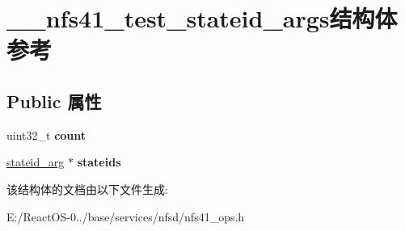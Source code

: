 \hypertarget{struct____nfs41__test__stateid__args}{}\section{\+\_\+\+\_\+nfs41\+\_\+test\+\_\+stateid\+\_\+args结构体 参考}
\label{struct____nfs41__test__stateid__args}
\subsection*{Public 属性}
\begin{DoxyCompactItemize}
\item 
\mbox{\label{struct____nfs41__test__stateid__args_ae82f79f9d5fd575590a52daec866e42f}} 
uint32\+\_\+t {\bfseries count}
\item 
\mbox{\label{struct____nfs41__test__stateid__args_a3b2a607d017b389f5719c0c03b014260}} 
\hyperlink{struct____stateid__arg}{stateid\+\_\+arg} $\ast$ {\bfseries stateids}
\end{DoxyCompactItemize}


该结构体的文档由以下文件生成\+:\begin{DoxyCompactItemize}
\item 
E\+:/\+React\+O\+S-\/0../base/services/nfsd/nfs41\+\_\+ops.\+h\end{DoxyCompactItemize}
